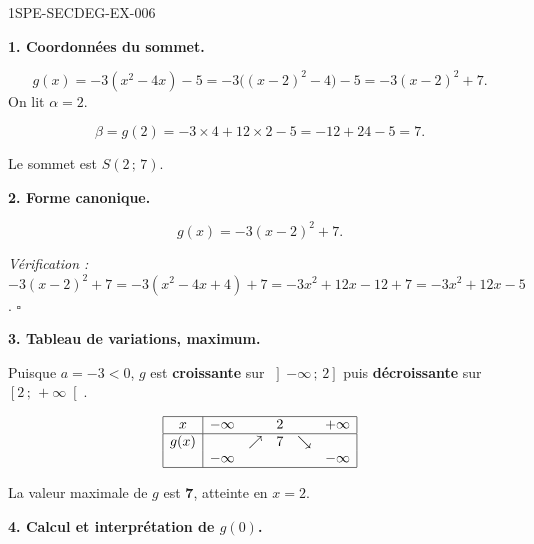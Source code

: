 \begin{corrige}{1SPE-SECDEG-EX-006}

\textbf{1. Coordonnées du sommet.}


\[g(x)=-3(x^2-4x)-5=-3\bigl((x-2)^2-4\bigr)-5=-3(x-2)^2+7.\]
On lit $\alpha=2$.

\[\beta = g(2) = -3 \times 4 + 12 \times 2 - 5 = -12 + 24 - 5 = 7.\]

Le sommet est $S(2\,;\,7)$.

\medskip
\textbf{2. Forme canonique.}


\[\boxed{g(x) = -3(x-2)^2 + 7.}\]

\textit{Vérification :} $-3(x-2)^2 + 7 = -3(x^2-4x+4)+7 = -3x^2+12x-12+7 = -3x^2+12x-5$. \hfill $\square$

\medskip
\textbf{3. Tableau de variations, maximum.}


Puisque $a = -3 < 0$, $g$ est \textbf{croissante} sur $\left]-\infty\,;\,2\right]$ puis \textbf{décroissante} sur $\left[2\,;\,+\infty\right[$.

\[
\begin{array}{|c|ccccc|}
\hline
x & -\infty & & 2 & & +\infty \\
\hline
g(x) & & \nearrow & 7 & \searrow & \\
 & -\infty & & & & -\infty \\
\hline
\end{array}
\]

La valeur maximale de $g$ est $\mathbf{7}$, atteinte en $x = 2$.

\medskip
\textbf{4. Calcul et interprétation de $g(0)$.}


\end{corrige}
